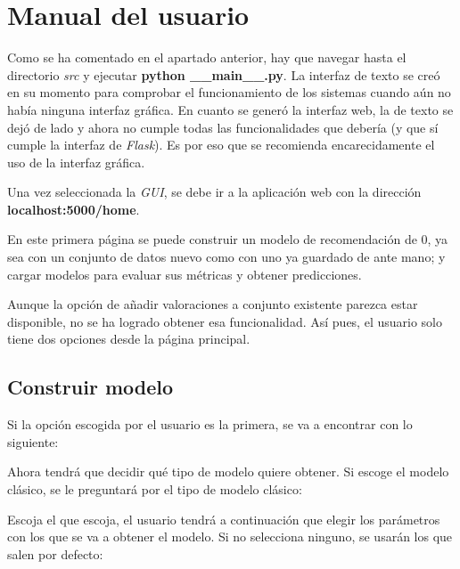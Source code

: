 \section{Manual del usuario}
Como se ha comentado en el apartado anterior, hay que navegar hasta el directorio \textit{src} y ejecutar \textbf{python \_\_main\_\_.py}. La interfaz de texto se creó en su momento para comprobar el funcionamiento de los sistemas cuando aún no había ninguna interfaz gráfica. En cuanto se generó la interfaz web, la de texto se dejó de lado y ahora no cumple todas las funcionalidades que debería (y que sí cumple la interfaz de \textit{Flask}). Es por eso que se recomienda encarecidamente el uso de la interfaz gráfica.

Una vez seleccionada la \textit{GUI}, se debe ir a la aplicación web con la dirección \textbf{localhost:5000/home}.


En este primera página se puede construir un modelo de recomendación de 0, ya sea con un conjunto de datos nuevo como con uno ya guardado de ante mano; y cargar modelos para evaluar sus métricas y obtener predicciones.

Aunque la opción de añadir valoraciones a conjunto existente parezca estar disponible, no se ha logrado obtener esa funcionalidad. Así pues, el usuario solo tiene dos opciones desde la página principal.

\subsection{Construir modelo}\label{construir-modelo}
Si la opción escogida por el usuario es la primera, se va a encontrar con lo siguiente:


Ahora tendrá que decidir qué tipo de modelo quiere obtener. Si escoge el modelo clásico, se le preguntará por el tipo de modelo clásico:


Escoja el que escoja, el usuario tendrá a continuación que elegir los parámetros con los que se va a obtener el modelo. Si no selecciona ninguno, se usarán los que salen por defecto:



